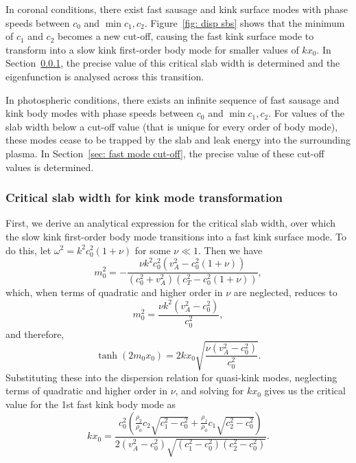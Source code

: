 In coronal conditions, there exist fast sausage and kink surface modes with phase speeds between $c_0$ and $\min{c_1, c_2}$. Figure~\ref{fig: disp sbs} shows that the minimum of $c_1$ and $c_2$ becomes a new cut-off, causing the fast kink surface mode to transform into a slow kink first-order body mode for smaller values of $kx_0$. In Section~\ref{sec: critical slab width}, the precise value of this critical slab width is determined and the eigenfunction is analysed across this transition.

In photospheric conditions, there exists an infinite sequence of fast sausage and kink body modes with phase speeds between $c_0$ and $\min{c_1, c_2}$. For values of the slab width below a cut-off value (that is unique for every order of body mode), these modes cease to be trapped by the slab and leak energy into the surrounding plasma. In Section~\ref{sec: fast mode cut-off}, the precise value of these cut-off values is determined.


\subsubsection{Critical slab width for kink mode transformation} \label{sec: critical slab width}
First, we derive an analytical expression for the critical slab width, over which the slow kink first-order body mode transitions into a fast kink surface mode. To do this, let $\omega^2 = k^2c_0^2(1 + \nu)$ for some $\nu \ll 1$. Then we have
\begin{equation}
m_0^2 = -\frac{\nu k^2c_0^2(v_A^2 - c_0^2(1 + \nu))}{(c_0^2 + v_A^2)(c_T^2 - c_0^2(1 + \nu))},
\end{equation}
which, when terms of quadratic and higher order in $\nu$ are neglected, reduces to
\begin{equation}
m_0^2 = \frac{\nu k^2(v_A^2 - c_0^2)}{c_0^2},
\end{equation}
and therefore,
\begin{equation}
\tanh(2m_0x_0) = 2kx_0\sqrt{\frac{\nu(v_A^2 - c_0^2)}{c_0^2}}.
\end{equation}
Substituting these into the dispersion relation for quasi-kink modes, neglecting terms of quadratic and higher order in $\nu$, and solving for $kx_0$ gives us the critical value for the 1st fast kink body mode as
\begin{equation}
kx_0 = \frac{c_0^2 \left(\frac{\rho_2}{\rho_0}c_2\sqrt{c_1^2 - c_0^2} + \frac{\rho_1}{\rho_0}c_1\sqrt{c_2^2 - c_0^2}\right)}{2(v_A^2 - c_0^2)\sqrt{(c_1^2 - c_0^2)(c_2^2 - c_0^2)}}.
\end{equation}

